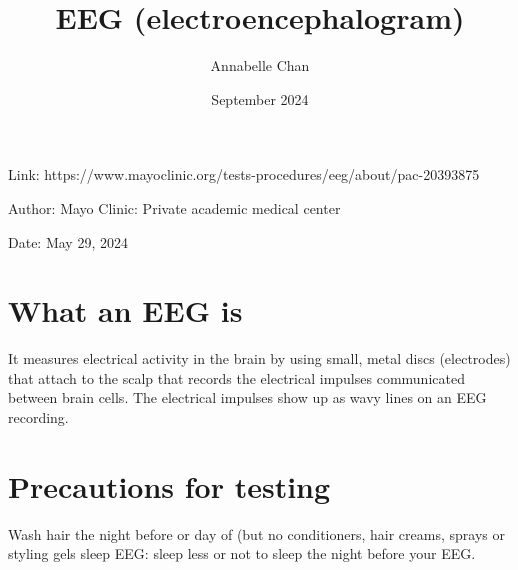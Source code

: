 \documentclass[12pt]{article}
\title{EEG (electroencephalogram)}
\author{Annabelle Chan}
\date{September 2024}
\begin{document}
\maketitle
Link: https://www.mayoclinic.org/tests-procedures/eeg/about/pac-20393875

Author: Mayo Clinic: Private academic medical center 

Date: May 29, 2024

\section{What an EEG is}
It measures electrical activity in the brain by using small, metal discs (electrodes) that attach to the scalp that records the electrical impulses communicated between brain cells. The electrical impulses show up as wavy lines on an EEG recording.

\section{Precautions for testing}
Wash hair the night before or day of (but no conditioners, hair creams, sprays or styling gels
sleep EEG: sleep less or not to sleep the night before your EEG.
\end{document}

